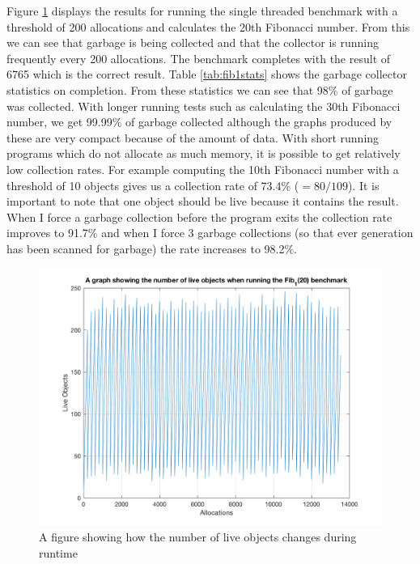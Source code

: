 \documentclass[../diss.tex]{subfiles}
\begin{document}
Figure \ref{fig:fib1graph} displays the results for running the single threaded benchmark with a threshold of 200 allocations and calculates the 20th Fibonacci number. From this we can see that garbage is being collected and that the collector is running frequently every 200 allocations. The benchmark completes with the result of 6765 which is the correct result. Table \ref{tab:fib1stats} shows the garbage collector statistics on completion. From these statistics we can see that 98\% of garbage was collected. With longer running tests such as calculating the 30th Fibonacci number, we get 99.99\% of garbage collected although the graphs produced by these are very compact because of the amount of data. With short running programs which do not allocate as much memory, it is possible to get relatively low collection rates. For example computing the 10th Fibonacci number with a threshold of 10 objects gives us a collection rate of 73.4\% ($=80/109$). It is important to note that one object should be live because it contains the result. When I force a garbage collection before the program exits the collection rate improves to 91.7\% and when I force 3 garbage collections (so that ever generation has been scanned for garbage) the rate increases to 98.2\%.

\begin{figure}
    \centering
    \includegraphics[max width=\linewidth]{figs/fib1.png}
    \caption{A figure showing how the number of live objects changes during runtime}
    \label{fig:fib1graph}
\end{figure}
\end{document}
